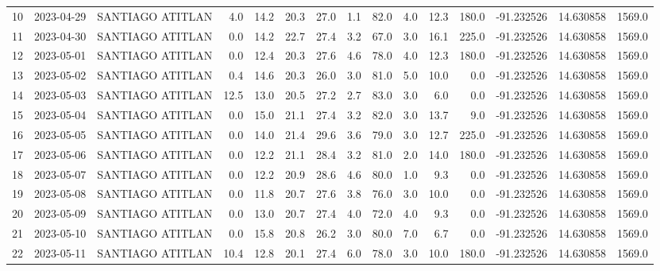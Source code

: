 \documentclass[12pt]{article}
\begin{document}
\begin{center}
\begin{tabular}{lllrrrrrrrrrrrr}
10  & 2023-04-29 &  SANTIAGO ATITLAN &     4.0 &  14.2 &   20.3 &  27.0 &      1.1 &     82.0 &  4.0 &        12.3 &       180.0 & -91.232526 &  14.630858 &   1569.0 \\
11  & 2023-04-30 &  SANTIAGO ATITLAN &     0.0 &  14.2 &   22.7 &  27.4 &      3.2 &     67.0 &  3.0 &        16.1 &       225.0 & -91.232526 &  14.630858 &   1569.0 \\
12  & 2023-05-01 &  SANTIAGO ATITLAN &     0.0 &  12.4 &   20.3 &  27.6 &      4.6 &     78.0 &  4.0 &        12.3 &       180.0 & -91.232526 &  14.630858 &   1569.0 \\
13  & 2023-05-02 &  SANTIAGO ATITLAN &     0.4 &  14.6 &   20.3 &  26.0 &      3.0 &     81.0 &  5.0 &        10.0 &         0.0 & -91.232526 &  14.630858 &   1569.0 \\
14  & 2023-05-03 &  SANTIAGO ATITLAN &    12.5 &  13.0 &   20.5 &  27.2 &      2.7 &     83.0 &  3.0 &         6.0 &         0.0 & -91.232526 &  14.630858 &   1569.0 \\
15  & 2023-05-04 &  SANTIAGO ATITLAN &     0.0 &  15.0 &   21.1 &  27.4 &      3.2 &     82.0 &  3.0 &        13.7 &         9.0 & -91.232526 &  14.630858 &   1569.0 \\
16  & 2023-05-05 &  SANTIAGO ATITLAN &     0.0 &  14.0 &   21.4 &  29.6 &      3.6 &     79.0 &  3.0 &        12.7 &       225.0 & -91.232526 &  14.630858 &   1569.0 \\
17  & 2023-05-06 &  SANTIAGO ATITLAN &     0.0 &  12.2 &   21.1 &  28.4 &      3.2 &     81.0 &  2.0 &        14.0 &       180.0 & -91.232526 &  14.630858 &   1569.0 \\
18  & 2023-05-07 &  SANTIAGO ATITLAN &     0.0 &  12.2 &   20.9 &  28.6 &      4.6 &     80.0 &  1.0 &         9.3 &         0.0 & -91.232526 &  14.630858 &   1569.0 \\
19  & 2023-05-08 &  SANTIAGO ATITLAN &     0.0 &  11.8 &   20.7 &  27.6 &      3.8 &     76.0 &  3.0 &        10.0 &         0.0 & -91.232526 &  14.630858 &   1569.0 \\
20  & 2023-05-09 &  SANTIAGO ATITLAN &     0.0 &  13.0 &   20.7 &  27.4 &      4.0 &     72.0 &  4.0 &         9.3 &         0.0 & -91.232526 &  14.630858 &   1569.0 \\
21  & 2023-05-10 &  SANTIAGO ATITLAN &     0.0 &  15.8 &   20.8 &  26.2 &      3.0 &     80.0 &  7.0 &         6.7 &         0.0 & -91.232526 &  14.630858 &   1569.0 \\
22  & 2023-05-11 &  SANTIAGO ATITLAN &    10.4 &  12.8 &   20.1 &  27.4 &      6.0 &     78.0 &  3.0 &        10.0 &       180.0 & -91.232526 &  14.630858 &   1569.0 \\

\end{tabular}
\end{center}
\end{document}
